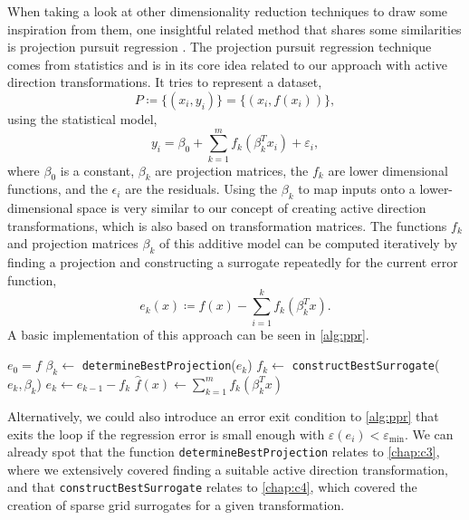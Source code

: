 \documentclass[
  a4paper,  %
  twoside,  %
  bibliography=totoc,
  headsepline,
  cleardoublepage=empty,
  parskip=half,
  draft=false
]{scrbook}
\begin{document}
When taking a look at other dimensionality reduction techniques to draw some inspiration from them, one insightful related method that shares some similarities is projection pursuit regression \cite{huber1985projection}.
The projection pursuit regression technique comes from statistics and is in its core idea related to our approach with active direction transformations.
It tries to represent a dataset,
\begin{equation}
P \coloneqq \{(x_i, y_i)\}=\{(x_i, f(x_i))\},
\end{equation}
using the statistical model,
\begin{equation}
y_i=\beta_0 + \sum_{k=1}^m f_k(\beta_k^T x_i) + \varepsilon_i,
\label{eq:ppr}
\end{equation}
where $\beta_0$ is a constant, $\beta_k$ are projection matrices, the $f_k$ are lower dimensional functions, and the $\epsilon_i$ are the residuals.
Using the $\beta_k$ to map inputs onto a lower-dimensional space is very similar to our concept of creating active direction transformations, which is also based on transformation matrices.
The functions $f_k$ and projection matrices $\beta_k$ of this additive model can be computed iteratively by finding a projection and constructing a surrogate repeatedly for the current error function,
\begin{equation}
e_k(x) \coloneqq f(x) - \sum_{i=1}^k f_k(\beta_k^T x).
\end{equation}
%
A basic implementation of this approach can be seen in \cref{alg:ppr}.

\begin{mdframed}[style=algstyle,frametitle={\textbf{function} \texttt{projectionPursuitRegression}{$(f, k_{\text{max}})$}}]
\normalsize
\vspace{5.5mm}
\begin{algorithmic}[1]

    \State $e_0 = f$
    	\State $\beta_k \gets$ \texttt{determineBestProjection}($e_k$)
    	\State $f_k \gets$ \texttt{constructBestSurrogate}($e_k, \beta_k$)
    	\State $e_k \gets e_{k - 1} - f_k$
    \EndFor
    \State $\hat{f}(x) \gets \sum_{k=1}^m f_k(\beta_k^T x)$
    \State {}
\end{algorithmic}

\vspace{-1.5mm}
\delimit

	\label{alg:ppr}
\end{mdframed}
%
Alternatively, we could also introduce an error exit condition to \cref{alg:ppr} that exits the loop if the regression error is small enough with $\varepsilon(e_i) < \varepsilon_{\mathrm{min}}$.
We can already spot that the function \texttt{determineBestProjection} relates to \cref{chap:c3}, where we extensively covered finding a suitable active direction transformation, and that \texttt{constructBestSurrogate} relates to \cref{chap:c4}, which covered the creation of sparse grid surrogates for a given transformation.
\end{document}
